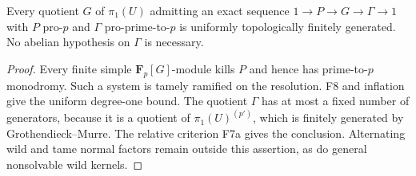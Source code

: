\begin{corollary}
Every quotient $G$ of $\pi_1(U)$ admitting an
exact sequence $1\to P\to G\to\Gamma\to1$ with $P$ pro-$p$ and
$\Gamma$ pro-prime-to-$p$ is uniformly topologically finitely
generated. No abelian hypothesis on $\Gamma$ is necessary.
\end{corollary}
\begin{proof}
Every finite simple $\mathbf F_p[G]$-module kills $P$ and hence has
prime-to-$p$ monodromy. Such a system is tamely ramified on the
resolution. F8 and inflation give the uniform degree-one bound.
The quotient $\Gamma$ has at most a fixed number of generators,
because it is a quotient of $\pi_1(U)^{(p')}$, which is finitely
generated by Grothendieck--Murre. The relative criterion F7a gives
the conclusion. Alternating wild and tame normal factors remain
outside this assertion, as do general nonsolvable wild kernels.
\end{proof}
